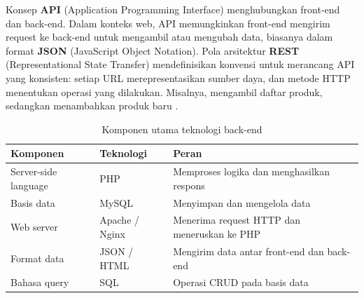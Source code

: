 
Konsep \textbf{API} (Application Programming Interface) menghubungkan front-end dan back-end. Dalam konteks web, API memungkinkan front-end mengirim request ke back-end untuk mengambil atau mengubah data, biasanya dalam format \textbf{JSON} (JavaScript Object Notation). Pola arsitektur \textbf{REST} (Representational State Transfer) mendefinisikan konvensi untuk merancang API yang konsisten: setiap URL merepresentasikan sumber daya, dan metode HTTP menentukan operasi yang dilakukan. Misalnya,  mengambil daftar produk, sedangkan  menambahkan produk baru \cite{mdnLearn}.

\begin{table}[H]
\centering
\begin{tabular}{|P{3cm}|P{4cm}|P{4.5cm}|}
\hline
\textbf{Komponen} & \textbf{Teknologi} & \textbf{Peran} \\
\hline
Server-side language & PHP & Memproses logika dan menghasilkan respons \\
\hline
Basis data & MySQL & Menyimpan dan mengelola data \\
\hline
Web server & Apache / Nginx & Menerima request HTTP dan meneruskan ke PHP \\
\hline
Format data & JSON / HTML & Mengirim data antar front-end dan back-end \\
\hline
Bahasa query & SQL & Operasi CRUD pada basis data \\
\hline
\end{tabular}
\caption{Komponen utama teknologi back-end}
\end{table}

